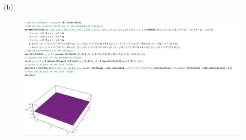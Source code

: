 \documentclass[journal,12pt,onecolumn]{IEEEtran}
\theoremstyle{remark}
\begin{document}
(b)   \begin{figure}[H]
    \centering
     \includegraphics[scale=0.5]{figs/c2.jpeg}
    \caption{}    
    \label{fig:ishitha.em.fig1}
   \end{figure} 
   
\end{document}
